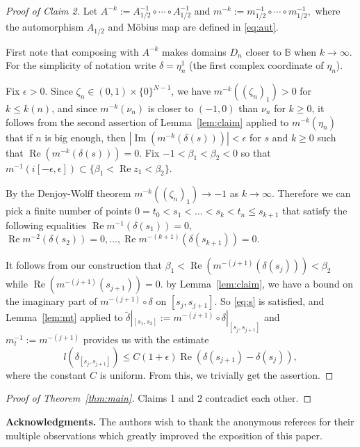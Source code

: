 \documentclass[a4paper,12pt]{amsart}
\def\im{\operatorname{Im}}
\def\re{\operatorname{Re}}
\theoremstyle{remark}\newtheorem{remark}[theorem]{Remark}
\begin{document}
\medskip
\begin{proof}[Proof of Claim 2]

Let $A^{-k} := A_{1/2}^{-1} \circ \cdots \circ A_{1/2}^{-1}$ and $m^{-k} := m_{1/2}^{-1} \circ \cdots \circ m_{1/2}^{-1},$ where the automorphism $A_{1/2}$ and M\"obius map are defined in \eqref{eq:aut}.


First note that composing with $A^{-k}$ makes domains $D_n$ closer to $\mathbb B$ when $k\to \infty$. For the simplicity of notation write $\delta= \eta_n^1$ (the first complex coordinate of $\eta_n$). 

Fix $\epsilon>0$. Since $\zeta_n\in (0,1)\times \{0\}^{N-1}$, 
we have $m^{-k}((\zeta_n)_1)>0$ for $k\le k(n)$, and
since $ m^{-k}(\nu_n)$ is closer to $(-1,0)$ than $\nu_n$ for $k\ge0$,
it follows from the second assertion of
Lemma~\ref{lem:claim} applied to $m^{-k}(\eta_n) $
that if $n$ is big enough, then $|\im(m^{-k}(\delta(s)))|<\epsilon$ for $s$ and $k\geq 0$ such that $\re(m^{-k}(\delta(s)))=0$.
Fix $-1<\beta_1<\beta_2<0$ so that $m^{-1}(i [-\epsilon,\epsilon])\subset \{\beta_1<\re z_1<\beta_2\}.$ 

By the Denjoy-Wolff theorem $m^{-k}((\zeta_n)_1)\to -1$ as $k\to\infty$. Therefore we can pick a finite number of points $0=t_0<s_1< \ldots< s_k<t_n \leq s_{k+1}$ that satisfy the following equalities $\re m^{-1}(\delta(s_1))=0$, $\re m^{-2}(\delta(s_2))=0, \ldots , \re m^{-(k+1)}(\delta(s_{k+1}))=0$. 

It follows from our construction that $\beta_1<\re(m^{-(j+1)}(\delta(s_j)))<\beta_2$ while $\re(m^{-(j+1)}(s_{j+1}))=0$.
by Lemma~\ref{lem:claim},  we have a bound on the imaginary part of $m^{-(j+1)}\circ \delta$ on $[s_j, s_{j+1}]$. So \eqref{eq:s} is satisfied, and  Lemma~\ref{lem:mt} applied to $\tilde\delta|_{[s_1, s_2]}:= m^{-(j+1)}\circ \delta|_{[s_j, s_{j+1}]}$ and $m^{-1}_t:=m^{-(j+1)}$ provides us with the  estimate $$l(\delta_{[s_{j}, s_{j+1}]})\leq C(1 + \epsilon) \re(\delta(s_{j+1}) - \delta(s_j)),$$ where the constant $C$ is uniform. From this, we trivially get the assertion.
\end{proof}

\begin{proof}[Proof of Theorem~\ref{thm:main}]
Claims 1 and 2 contradict each other.
\end{proof}

{\bf Acknowledgments.} The authors wish to thank the anonymous referees for their multiple observations which greatly improved the exposition of this paper.
\end{document}
